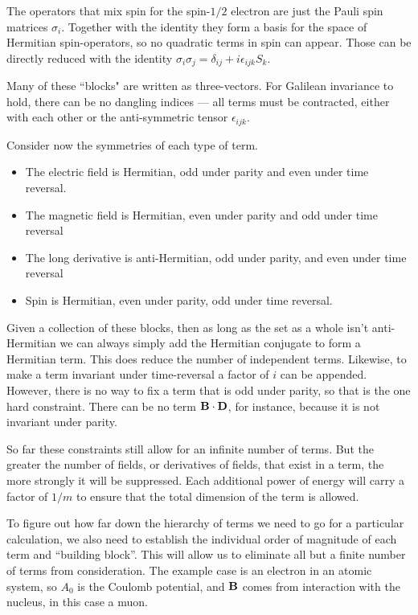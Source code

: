 The operators that mix spin for the spin-$1/2$ electron are just the Pauli spin matrices $\sigma_i$.  Together with the identity they form a basis for the space of Hermitian spin-operators, so no quadratic terms in spin can appear.  Those can be directly reduced with the identity $\sigma_i \sigma_j = \delta_{ij} + i\epsilon_{ijk} S_k$.

Many of these ``blocks" are written as three-vectors.  For Galilean invariance to hold, there can be no dangling indices --- all terms must be contracted, either with each other or the anti-symmetric tensor $\epsilon_{ijk}$.

Consider now the symmetries of each type of term.
\begin{itemize}
  \item The electric field is Hermitian, odd under parity and even under time reversal.  
  \item The magnetic field is Hermitian, even under parity and odd under time reversal
  \item The long derivative is anti-Hermitian, odd under parity, and even under time reversal
  \item Spin is Hermitian, even under parity, odd under time reversal.
\end{itemize}

Given a collection of these blocks, then as long as the set as a whole isn't anti-Hermitian we can always simply add the Hermitian conjugate to form a Hermitian term.  This does reduce the number of independent terms.  Likewise, to make a term invariant under time-reversal a factor of $i$ can be appended.  However, there is no way to fix a term that is odd under parity, so that is the one hard constraint.  There can be no term $\mathbf{B} \cdot \mathbf{D}$, for instance, because it is not invariant under parity.


So far these constraints still allow for an infinite number of terms.  But the greater the number of fields, or derivatives of fields, that exist in a term, the more strongly it will be suppressed.  Each additional power of energy will carry a factor of $1/m$ to ensure that the total dimension of the term is allowed.

To figure out how far down the hierarchy of terms we need to go for a particular calculation, we also need to establish the individual order of magnitude of each term and ``building block''.  This will allow us to eliminate all but a finite number of terms from consideration.  The example case is an electron in an atomic system, so $A_0$ is the Coulomb potential, and $\mathbf{B}$ comes from interaction with the nucleus, in this case a muon.

